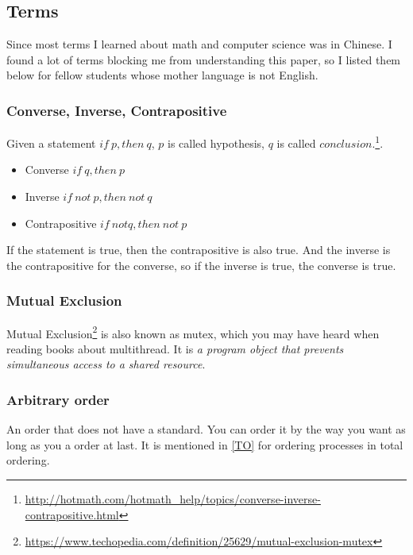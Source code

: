 \documentclass[12pt,a4paper,oneside]{article}
\begin{document}
\subsection{Terms} \label{l1}

Since most terms I learned about math and computer science was in Chinese. I found a lot of terms blocking
me from understanding this paper, so I listed them below for fellow students whose mother language is not English.

\medskip


\subsubsection{Converse, Inverse, Contrapositive}

Given a statement $if\ p, then\ q$, $p$ is called hypothesis, $q$ is called $conclusion$.\footnote{\url{http://hotmath.com/hotmath_help/topics/converse-inverse-contrapositive.html}}.

\begin{itemize}
    \item Converse  $if\ q, then\ p$
    \item Inverse $if\ not\ p, then\ not\ q$
    \item Contrapositive $if\ not q, then\ not\ p$
\end{itemize}

If the statement is true, then the contrapositive is also true.
And the inverse is the contrapositive for the converse, so if the inverse is true, the converse is true.

\subsubsection{Mutual Exclusion}

Mutual Exclusion\footnote{\url{https://www.techopedia.com/definition/25629/mutual-exclusion-mutex}} is also known as mutex,
which you may have heard when reading books about multithread.
It is \textit{a program object that prevents simultaneous access to a shared resource}.

\subsubsection{Arbitrary order} \label{term:arbitrary_order}

An order that does not have a standard. You can order it by the way you want as long as you a order at last.
It is mentioned in \ref{TO} for ordering processes in total ordering.
\end{document}
